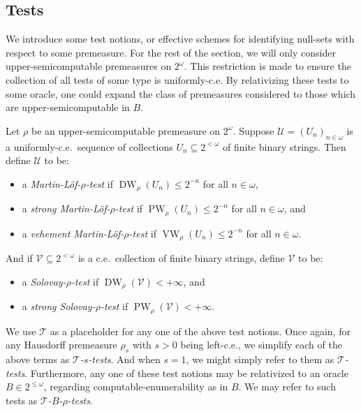 \subsection{Tests}
We introduce some test notions, or effective schemes for identifying null-sets with respect to some premeasure. For the rest of the section, we will only consider upper-semicomputable premeasures on $2^\omega$. This restriction is made to ensure the collection of all tests of some type is uniformly-c.e. By relativizing these tests to some oracle, one could expand the class of premeasures considered to those which are upper-semicomputable in $B$.

\begin{definition}
    Let $\rho$ be an upper-semicomputable premeasure on $2^\omega$. Suppose $\mathcal{U} = (U_n)_{n \in \omega}$ is a uniformly-c.e.~sequence of collections $U_n \subseteq 2^{<\omega}$ of finite binary strings. Then define $\mathcal{U}$ to be: 
    \begin{itemize}
        \item a \textit{Martin-L{\"o}f-$\rho$-test} if $\operatorname{DW}_\rho(U_n) \leq 2^{-n}$ for all $n \in \omega$,
        \item a \textit{strong Martin-L{\"o}f-$\rho$-test} if $\operatorname{PW}_\rho(U_n) \leq 2^{-n}$ for all $n \in \omega$, and
        \item a \textit{vehement Martin-L{\"o}f-$\rho$-test} if $\operatorname{VW}_\rho(U_n) \leq 2^{-n}$ for all $n \in \omega$.
    \end{itemize}
    And if $\mathcal{V} \subseteq 2^{<\omega}$ is a c.e.~collection of finite binary strings, define $\mathcal{V}$ to be:
    \begin{itemize}
        \item a \textit{Solovay-$\rho$-test} if $\operatorname{DW}_\rho(\mathcal{V}) < + \infty$, and
        \item a \textit{strong Solovay-$\rho$-test} if $\operatorname{PW}_\rho(\mathcal{V}) < + \infty$.
    \end{itemize}
\end{definition}

We use $\mathcal{T}$ as a placeholder for any one of the above test notions. Once again, for any Hausdorff premeasure $\rho_s$ with $s > 0$ being left-c.e., we simplify each of the above terms as \textit{$\mathcal{T}$-$s$-tests}. And when $s = 1$, we might simply refer to them as \textit{$\mathcal{T}$-tests}. Furthermore, any one of these test notions may be relativized to an oracle $B \in 2^{\leq \omega}$, regarding computable-enumerability as in $B$. We may refer to such tests as \textit{$\mathcal{T}$-$B$-$\rho$-tests}. 

